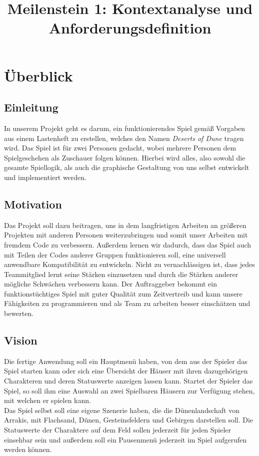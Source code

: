 \documentclass{uulm-assignment}
\title{Meilenstein 1: Kontextanalyse und Anforderungsdefinition}
\begin{document}
\maketitle

\section{Überblick}

\subsection{Einleitung}

In unserem Projekt geht es darum, ein funktionierendes Spiel gemäß Vorgaben aus einem Lastenheft zu erstellen, welches den Namen \textit{Deserts of Dune} tragen wird. Das Spiel ist für zwei Personen gedacht, wobei mehrere Personen dem Spielgeschehen als Zuschauer folgen können. Hierbei wird alles, also sowohl die gesamte Spiellogik, als auch die graphische Gestaltung von uns selbst entwickelt und implementiert werden.

\subsection{Motivation}

Das Projekt soll dazu beitragen, uns in dem langfristigen Arbeiten an größeren Projekten mit anderen Personen weiterzubringen und somit unser Arbeiten mit fremdem Code zu verbessern. Außerdem lernen wir dadurch, dass das Spiel auch mit Teilen der Codes anderer Gruppen funktionieren soll, eine universell anwendbare Kompatibilität zu entwickeln. Nicht zu vernachlässigen ist, dass jedes Teammitglied lernt seine Stärken einzusetzen und durch die Stärken anderer mögliche Schwächen verbessern kann.
Der Auftraggeber bekommt ein funktionstüchtiges Spiel mit guter Qualität zum Zeitvertreib und kann unsere Fähigkeiten zu programmieren und als Team zu arbeiten besser einschätzen und bewerten.

\subsection{Vision}

Die fertige Anwendung soll ein Hauptmenü haben, von dem aus der Spieler das Spiel starten kann oder sich eine Übersicht der Häuser mit ihren dazugehörigen Charakteren und deren Statuswerte anzeigen lassen kann. 
Startet der Spieler das Spiel, so soll ihm eine Auswahl an zwei Spielbaren Häusern zur Verfügung stehen, mit welchen er spielen kann. \\
Das Spiel selbst soll eine eigene Szenerie haben, die die Dünenlandschaft von Arrakis, mit Flachsand, Dünen, Gesteinsfeldern und Gebirgen darstellen soll. Die Statuswerte der Charaktere auf dem Feld sollen jederzeit für jeden Spieler einsehbar sein und außerdem soll ein Pausenmenü jederzeit im Spiel aufgerufen werden können.
\end{document}
